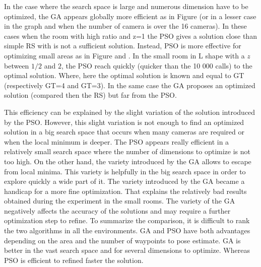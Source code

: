 In the case where the search space is large and numerous dimension have to be optimized, the GA appears globally more efficient as in Figure  (or in a lesser case in the graph   and   when the number of camera is over the 16 cameras). In these cases when  the room with high ratio and z=1 the PSO gives a solution close than simple RS with is not a sufficient solution.
 Instead, PSO is more effective for optimizing small areas as in Figure  and . In the small room in L shape with a $z$ between $1/2$ and $2$, the PSO reach quickly (quicker than the 10 000 calls) to the optimal solution. Where, here the optimal solution is known and equal to GT (respectively GT=4 and GT=3). In the same case the GA proposes an optimized solution (compared then the RS) but far from the PSO.
 
 This efficiency can be explained by the slight variation of the solution introduced by the PSO. However, this slight variation is not enough to find an optimized solution in a big search space that occurs when many cameras are required or when the local minimum is deeper. The PSO appears really efficient in a relatively small search space where the number of dimensions to optimize is not too high.
 On the other hand, the variety  introduced by the GA allows to escape from local minima. This variety is helpfully  in the big search space in order to explore quickly a wide part of it. The variety introduced by the GA became a handicap for a more fine optimization. That explains the relatively bad results obtained during the experiment in the small rooms. The variety of the GA negatively affects the accuracy of the solutions and may require a further optimization step to refine. 
To summarize the comparison, it is difficult to rank the two algorithms in all the environments. GA and PSO have both advantages depending on the area and the number of waypoints to pose estimate. GA is better in the vast search space and for several dimensions to optimize. Whereas PSO is efficient to refined faster the solution. 
 
% 

